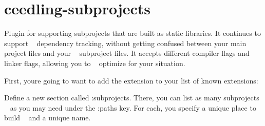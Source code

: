 \chapter{ceedling-\/subprojects}
\hypertarget{md__unit_test_framework2_2vendor_2ceedling_2plugins_2subprojects_2_r_e_a_d_m_e}{}\label{md__unit_test_framework2_2vendor_2ceedling_2plugins_2subprojects_2_r_e_a_d_m_e}
Plugin for supporting subprojects that are built as static libraries. It continues to support ~\newline
 dependency tracking, without getting confused between your main project files and your ~\newline
 subproject files. It accepts different compiler flags and linker flags, allowing you to ~\newline
 optimize for your situation.

First, you\textquotesingle{}re going to want to add the extension to your list of known extensions\+:


\begin{DoxyCode}{0}

\end{DoxyCode}


Define a new section called \+:subprojects. There, you can list as many subprojects ~\newline
 as you may need under the \+:paths key. For each, you specify a unique place to build ~\newline
 and a unique name.


\begin{DoxyCode}{0}

\end{DoxyCode}


